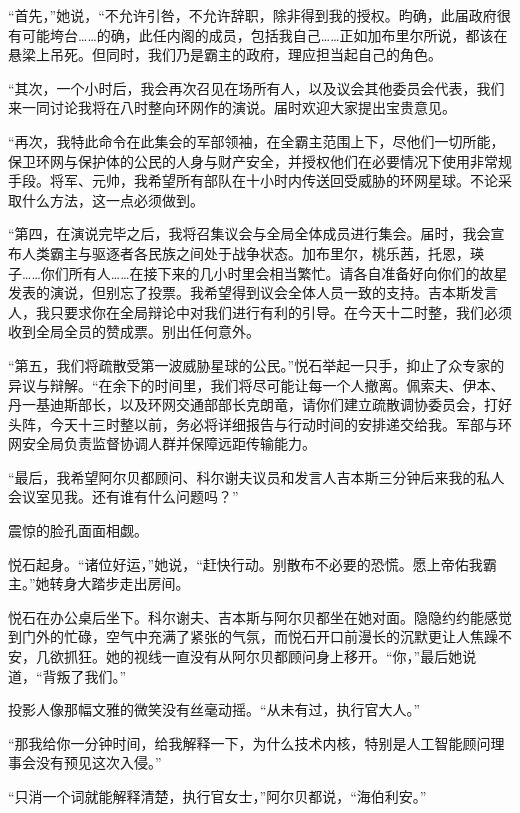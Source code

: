 \documentclass[AutoFakeBold=true]{book}
\begin{document}
``首先，''她说，``不允许引咎，不允许辞职，除非得到我的授权。昀确，此届政府很有可能垮台……的确，此任内阁的成员，包括我自己……正如加布里尔所说，都该在悬梁上吊死。但同时，我们乃是霸主的政府，理应担当起自己的角色。

``其次，一个小时后，我会再次召见在场所有人，以及议会其他委员会代表，我们来一同讨论我将在八时整向环网作的演说。届时欢迎大家提出宝贵意见。

``再次，我特此命令在此集会的军部领袖，在全霸主范围上下，尽他们一切所能，保卫环网与保护体的公民的人身与财产安全，并授权他们在必要情况下使用非常规手段。将军、元帅，我希望所有部队在十小时内传送回受威胁的环网星球。不论采取什么方法，这一点必须做到。

``第四，在演说完毕之后，我将召集议会与全局全体成员进行集会。届时，我会宣布人类霸主与驱逐者各民族之间处于战争状态。加布里尔，桃乐茜，托恩，瑛子……你们{\kaishu 所有人}……在接下来的几小时里会相当繁忙。请各自准备好向你们的故星发表的演说，但{\kaishu 别忘了投票}。我希望得到议会全体人员一致的支持。吉本斯发言人，我只要求你在全局辩论中对我们进行有利的引导。在今天十二时整，我们必须收到全局全员的赞成票。别出任何意外。

``第五，我们将疏散受第一波威胁星球的公民。''悦石举起一只手，抑止了众专家的异议与辩解。``在余下的时间里，我们将尽可能让每一个人撤离。佩索夫、伊本、丹一基迪斯部长，以及环网交通部部长克朗竜，请你们建立疏散调协委员会，打好头阵，今天十三时整以前，务必将详细报告与行动时间的安排递交给我。军部与环网安全局负责监督协调人群并保障远距传输能力。

``最后，我希望阿尔贝都顾问、科尔谢夫议员和发言人吉本斯三分钟后来我的私人会议室见我。还有谁有什么问题吗？''

震惊的脸孔面面相觑。

悦石起身。``诸位好运，''她说，``赶快行动。别散布不必要的恐慌。愿上帝佑我霸主。''她转身大踏步走出房间。

\vspace*{1em}

悦石在办公桌后坐下。科尔谢夫、吉本斯与阿尔贝都坐在她对面。隐隐约约能感觉到门外的忙碌，空气中充满了紧张的气氛，而悦石开口前漫长的沉默更让人焦躁不安，几欲抓狂。她的视线一直没有从阿尔贝都顾问身上移开。``你，''最后她说道，``背叛了我们。''

投影人像那幅文雅的微笑没有丝毫动摇。``从未有过，执行官大人。''

``那我给你一分钟时间，给我解释一下，为什么技术内核，特别是人工智能顾问理事会没有预见这次入侵。''

``只消一个词就能解释清楚，执行官女士，''阿尔贝都说，``海伯利安。''
\end{document}
